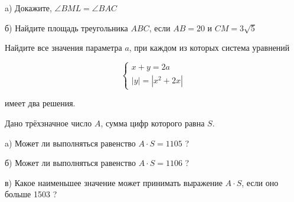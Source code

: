 a) Докажите, $\angle B M L=\angle B A C$

б) Найдите площадь треугольника $A B C$, если $A B=20$ и $C M=3 \sqrt{5}$

 Найдите все значения параметра $a$, при каждом из которых система уравнений

$$
\left\{\begin{array}{l}
x+y=2 a \\
|y|=\left|x^2+2 x\right|
\end{array}\right.
$$


имеет два решения.

 Дано трёхзначное число $A$, сумма цифр которого равна $S$.

a) Может ли выполняться равенство $A \cdot S=1105$ ?

б) Может ли выполняться равенство $A \cdot S=1106$ ?

в) Какое наименьшее значение может принимать выражение $A \cdot S$, если оно больше 1503 ?


